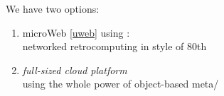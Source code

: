\clearpage{}\secdown

We have two options:
\begin{enumerate}[nosep]
  \item microWeb \ref{uweb} using \uF:\\networked retrocomputing in style of
  80th
  \item \emph{full-sized cloud platform}\\using the whole power of object-based
  meta/\F
\end{enumerate}



\secup